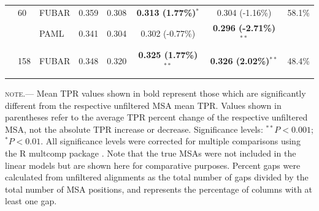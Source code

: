 \documentclass[11pt]{article}
\begin{document}
\begin{table}[htbp]
\begin{adjustwidth}{-1cm}{}
\begin{tabular}{l l l c c c c c}
 & 60 & FUBAR & 0.359 & 0.308 & \textbf{0.313 (1.77\%)$^{\ast}$} & 0.304 (-1.16\%) & 58.1\%\\
 & & PAML & 0.341 & 0.304 &0.302 (-0.77\%) & \textbf{0.296 (-2.71\%)$^{\ast\ast}$} & \\

 & 158 & FUBAR & 0.348 & 0.320 & \textbf{0.325 (1.77\%)$^{\ast\ast}$} & \textbf{0.326 (2.02\%)$^{\ast\ast}$} & 48.4\% \\
\noalign{\smallskip}\hline\noalign{\smallskip}
\end{tabular}
\newline
\textsc{note.}--- Mean TPR values shown in bold represent those which are significantly different from the respective unfiltered MSA mean TPR. Values shown in parentheses refer to the average TPR percent change of the respective unfiltered MSA, not the absolute TPR increase or decrease. Significance levels:  $^{\ast\ast} P < 0.001$; $^{\ast} P < 0.01$. All significance levels were corrected for multiple comparisons using the R multcomp package \citep{Hothorn2008}. Note that the true MSAs were not included in the linear models but are shown here for comparative purposes. Percent gaps were calculated from unfiltered alignments as the total number of gaps divided by the total number of MSA positions, and represents the percentage of columns with at least one gap.
\end{adjustwidth}
\end{table}
\end{document}
